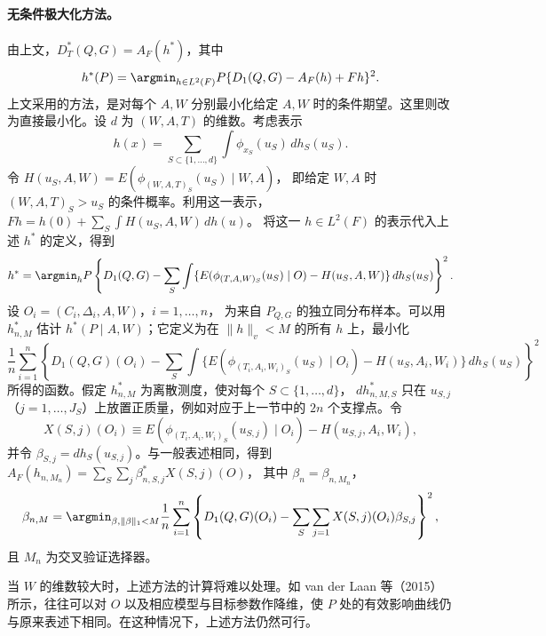\paragraph{无条件极大化方法。}
由上文，$D_T^*(Q,G)=A_F(h^*)$，其中
\[
 h^*(P)=\argmin_{h\in L^2(F)}P\{D_1(Q,G)-A_F(h)+Fh\}^2.
\]
上文采用的方法，是对每个 $A,W$ 分别最小化给定 $A,W$ 时的条件期望。这里则改为直接最小化。设 $d$ 为 $(W,A,T)$ 的维数。考虑表示
\[
 h(x)=\sum_{S\subset\{1,\ldots,d\}}\int\phi_{x_S}(u_S)\,dh_S(u_S).
\]
令
$H(u_S,A,W)=E(\phi_{(W,A,T)_S}(u_S)\mid W,A)$，
即给定 $W,A$ 时 $(W,A,T)_S>u_S$ 的条件概率。利用这一表示，
$Fh=h(0)+\sum_S\int H(u_S,A,W)\,dh(u)$。
将这一 $h\in L^2(F)$ 的表示代入上述 $h^*$ 的定义，得到
\[
 h^*=\argmin_h P\left\{D_1(Q,G)-\sum_S\int
 \{E(\phi_{(T,A,W)_S}(u_S)\mid O)-H(u_S,A,W)\}\,dh_S(u_S)
 \right\}^2.
\]
设 $O_i=(C_i,\Delta_i,A,W)$，$i=1,\ldots,n$，
为来自 $P_{Q,G}$ 的独立同分布样本。可以用 $h_{n,M}^*$ 估计 $h^*(P\mid A,W)$；它定义为在 $\|h\|_v<M$ 的所有 $h$ 上，最小化
\[
 \frac1n\sum_{i=1}^n\left\{D_1(Q,G)(O_i)-\sum_S\int
 \{E(\phi_{(T_i,A_i,W_i)_S}(u_S)\mid O_i)-H(u_S,A_i,W_i)\}
 \,dh_S(u_S)\right\}^2
\]
所得的函数。假定 $h_{n,M}^*$ 为离散测度，使对每个 $S\subset\{1,\ldots,d\}$，
$dh_{n,M,S}^*$ 只在 $u_{S,j}$（$j=1,\ldots,J_S$）上放置正质量，例如对应于上一节中的 $2n$ 个支撑点。令
\[
 X(S,j)(O_i)\equiv
 E(\phi_{(T_i,A_i,W_i)_S}(u_{S,j})\mid O_i)-H(u_{S,j},A_i,W_i),
\]
并令 $\beta_{S,j}=dh_S(u_{S,j})$。与一般表述相同，得到
$A_F(h_{n,M_n})=\sum_S\sum_j\beta_{n,S,j}^*X(S,j)(O)$，
其中 $\beta_n=\beta_{n,M_n}$，
\[
 \beta_{n,M}=\argmin_{\beta,\|\beta\|_1<M}\frac1n\sum_{i=1}^n
 \left\{D_1(Q,G)(O_i)-\sum_S\sum_{j=1}
 X(S,j)(O_i)\beta_{S,j}\right\}^2,
\]
且 $M_n$ 为交叉验证选择器。

当 $W$ 的维数较大时，上述方法的计算将难以处理。如 van der Laan 等（2015）所示，往往可以对 $O$ 以及相应模型与目标参数作降维，使 $P$ 处的有效影响曲线仍与原来表述下相同。在这种情况下，上述方法仍然可行。
